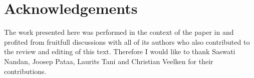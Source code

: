 \documentclass[a4paper,english,11pt]{article}
\begin{document}
\section*{Acknowledgements}
The work presented here was performed in the context of the paper in \cite{Lange:2023gbe} and profited from fruitfull discussions with all of its authors who also contributed to the review and editing of this text. Therefore I would like to thank Saswati Nandan, Joosep Pataa, Laurits Tani and Christian Veelken for their contributions.
\clearpage

\end{document}
